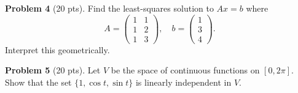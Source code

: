 \documentclass{amsart}
\begin{document}
\bigskip

\textbf{Problem 4} (20 pts). Find the least-squares solution to $Ax = b$ where
\[
A = \begin{pmatrix}1&1\\1&2\\1&3\end{pmatrix}, \quad b = \begin{pmatrix}1\\3\\4\end{pmatrix}.
\]
Interpret this geometrically.

\bigskip

\textbf{Problem 5} (20 pts). Let $V$ be the space of continuous functions on $[0, 2\pi]$. Show that the set $\{1, \cos t, \sin t\}$ is linearly independent in $V$.
\end{document}
